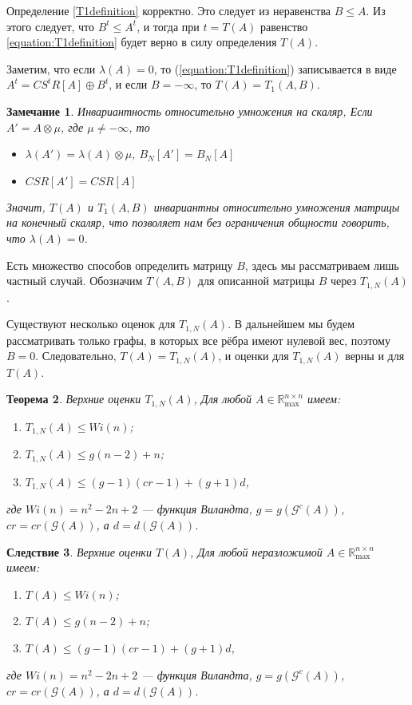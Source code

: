 \documentclass[12pt]{article}
\newtheorem{theorem}{Теорема}[section]
\newtheorem{remark}[theorem]{Замечание}
\newtheorem{corollary}[theorem]{Следствие}
\begin{document}
Определение \ref{T1definition} корректно. Это следует из неравенства $B \le A$. Из этого следует, что $B^t \le A^t$, и тогда при $t = T(A)$ равенство \ref{equation:T1definition} будет верно в силу определения $T(A)$.

Заметим, что если $\lambda(A) = 0$, то (\ref{equation:T1definition}) записывается в виде $A^t = CS^tR[A] \oplus B^t$, и если $B = -\infty$, то $T(A) = T_1(A, B)$.

\begin{remark}Инвариантность относительно умножения на скаляр, \cite[стр. 287]{bounds}
\label{invarianceOfT}
Если $A' = A \otimes \mu$, где $\mu \ne -\infty$, то

\begin{itemize}
	\item $\lambda(A') = \lambda(A) \otimes \mu$, $B_N[A'] = B_N[A]$
	\item $CSR[A'] = CSR[A]$
\end{itemize}

Значит, $T(A)$ и $T_1(A, B)$ инвариантны относительно умножения матрицы на конечный скаляр, что позволяет нам без ограничения общности говорить, что $\lambda(A) = 0$.
\end{remark}

Есть множество способов определить матрицу $B$, здесь мы рассматриваем лишь частный случай. Обозначим $T(A, B)$ для описанной матрицы $B$ через $T_{1, N}(A)$.

Существуют несколько оценок для $T_{1, N}(A)$. В дальнейшем мы будем рассматривать только графы, в которых все рёбра имеют нулевой вес, поэтому $B = 0$. Следовательно, $T(A) = T_{1, N}(A)$, и оценки для $T_{1, N}(A)$ верны и для $T(A)$.

\begin{theorem} Верхние оценки $T_{1, N}(A)$, \cite[теорема 4.1]{15WeakCSRExpantion}
Для любой $A \in \mathbb{R}_{\max}^{n \times n}$ имеем:
\begin{enumerate} 
    \item $T_{1, N}(A) \le Wi(n)$;
    \item $T_{1, N}(A) \le g(n - 2) + n$;
    \item $T_{1, N}(A) \le (g - 1)(cr - 1) + (g + 1) d$,
\end{enumerate}
где $Wi(n) = n^2 - 2n + 2$ --- функция Виландта, $g = g(\mathcal{G}^c(A))$, $cr = cr(\mathcal{G}(A))$, а $d = d(\mathcal{G}(A))$.
\end{theorem}

\begin{corollary} Верхние оценки $T(A)$, \cite[теорема 4.1]{15WeakCSRExpantion}
\label{upperBounds}
Для любой неразложимой $A \in \mathbb{R}_{\max}^{n \times n}$ имеем:
\begin{enumerate} 
    \item $T(A) \le Wi(n)$;
    \item $T(A) \le g(n - 2) + n$;
    \item $T(A) \le (g - 1)(cr - 1) + (g + 1) d$,
\end{enumerate}
где $Wi(n) = n^2 - 2n + 2$ --- функция Виландта, $g = g(\mathcal{G}^c(A))$, $cr = cr(\mathcal{G}(A))$, а $d = d(\mathcal{G}(A))$.
\end{corollary}
\end{document}
